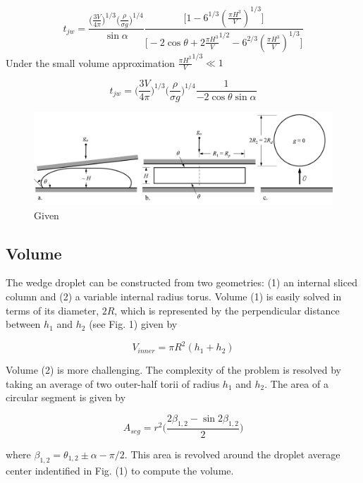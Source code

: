 \documentclass{article}
\begin{document}
\begin{equation}
t_{jw} = \frac{\big(\frac{3V}{4\pi}\big)^{1/3}\big(\frac{\rho}{\sigma g}\big)^{1/4}}{\sin\alpha} \frac{\Big[1 - 6^{1/3}(\frac{\pi H^3}{V})^{1/3}\Big]}{\Big[-2\cos\theta + 2\frac{\pi H^3}{V}^{1/2}- 6^{2/3}(\frac{\pi H^3}{V})^{1/3}\Big]}
\end{equation} 
Under the small volume approximation $\frac{\pi H^3}{V}^{1/3} \ll 1$

\begin{equation}
t_{jw} = \Big(\frac{3V}{4\pi}\Big)^{1/3}\Big(\frac{\rho}{\sigma g}\Big)^{1/4}\frac{1}{-2\cos\theta\sin\alpha} 
\end{equation} 

\begin{figure}
	\centering
	\includegraphics[scale=0.13]{Figures/PuddleJump}
	\caption{Given}
\end{figure}

\subsection*{Volume} 

The wedge droplet can be constructed from two geometries: (1) an internal sliced column and (2) a variable internal radius torus. Volume (1) is easily solved in terms of its diameter, $2R$, which is represented by the perpendicular distance between $h_1$ and $h_2$ (see Fig. 1) given by

\begin{equation} 
V_{inner} = \pi R^2 (h_1 + h_2)
\end{equation}

Volume (2) is more challenging. The complexity of the problem is resolved by taking an average of two outer-half torii of radius $h_1$ and $h_2$. The area of a circular segment is given by

\begin{equation}A_{seg} = r^2 \Big( \frac{2\beta_{1,2} - \sin2 \beta_{1,2}}{2} \Big)
\end{equation}

where $\beta_{1,2} = \theta_{1,2} \pm \alpha - \pi/2$. This area is revolved around the droplet average center indentified in Fig. (1) to compute the volume.
\end{document}
